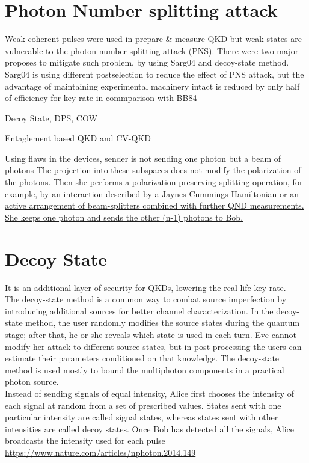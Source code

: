\documentclass[12pt,a4paper]{article}
\begin{document}
\section{Photon Number splitting attack}
Weak coherent pulses were used in prepare \& measure QKD but weak states are vulnerable to the photon number splitting attack (PNS). 
There were two major proposes to mitigate such problem, by using Sarg04 and decoy-state method. Sarg04 is using different postselection to reduce the effect of PNS attack, but the advantage of maintaining experimental machinery intact is reduced by only half of efficiency for key rate in commparison with BB84

Decoy State, DPS, COW

Entaglement based QKD and CV-QKD


Using flaws in the devices, sender is not sending one photon but a beam of photons \href{https://link.springer.com/chapter/10.1007/978-3-319-56246-9_12}{The projection into these subspaces does not modify the polarization of the
photons. Then she performs a polarization-preserving splitting operation, for
example, by an interaction described by a Jaynes-Cummings Hamiltonian or an
active arrangement of beam-splitters combined with further QND measurements.
She keeps one photon and sends the other (n-1) photons to Bob.}
\section{Decoy State}
It is an additional layer of security for QKDs, lowering the real-life key rate. \\
The decoy-state method is a common way to combat source
imperfection by introducing additional sources for better channel
characterization. In the decoy-state method, the user randomly
modifies the source states during the quantum stage; after
that, he or she reveals which state is used in each turn. Eve
cannot modify her attack to different source states, but in
post-processing the users can estimate their parameters conditioned on that knowledge. The decoy-state method is used
mostly to bound the multiphoton components in a practical
photon source. \\
Instead of sending signals of equal intensity, Alice first chooses the intensity of each signal at random from a set of prescribed values. States sent
with one particular intensity are called signal states, whereas states
sent with other intensities are called decoy states. Once Bob has
detected all the signals, Alice broadcasts the intensity used for
each pulse
\url{https://www.nature.com/articles/nphoton.2014.149}
\end{document}
